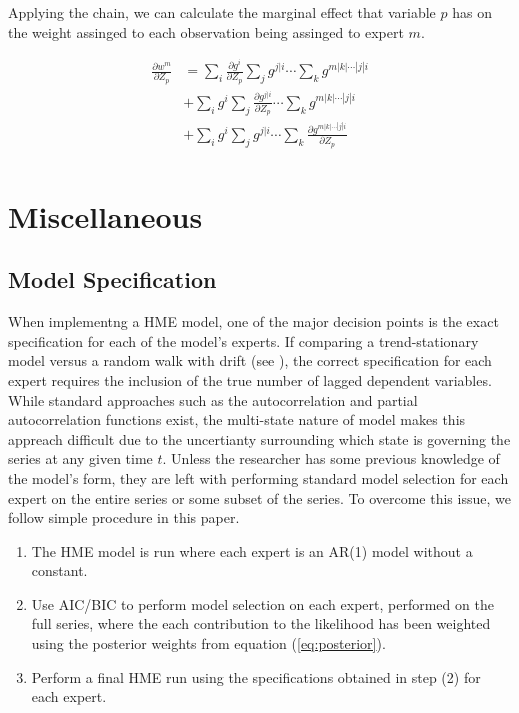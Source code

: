 \documentclass[12pt]{article}
\begin{document}
Applying the chain, we can calculate the marginal effect that variable $p$ has on the weight assinged to each observation being assinged to expert $m$.

\begin{equation}
  \begin{split}
    \frac{\partial w^{m}}{\partial Z_{p}} &= \sum_{i} \frac{\partial g^{i}}{\partial Z_{p}} \sum_{j} g^{j|i} \cdots \sum_{k} g^{m|k|\cdots|j|i} \\
    &+ \sum_{i} g^{i} \sum_{j} \frac{\partial g^{j|i}}{\partial Z_{p}} \cdots \sum_{k} g^{m|k|\cdots|j|i} \\
    &+ \sum_{i} g^{i} \sum_{j} g^{j|i} \cdots \sum_{k} \frac{\partial g^{m|k|\cdots|j|i}}{\partial Z_{p}} \\
  \end{split}
\end{equation}



\section{Miscellaneous}



\subsection{Model Specification}
When implementng a HME model, one of the major decision points is the exact specification for each of the model's experts. If comparing a trend-stationary model versus a random walk with drift (see \cite{HuertaJiangTanner2003}), the correct specification for each expert requires the inclusion of the true number of lagged dependent variables. While standard approaches such as the autocorrelation and partial autocorrelation functions exist, the multi-state nature of model makes this appreach difficult due to the uncertianty surrounding which state is governing the series at any given time $t$. Unless the researcher has some previous knowledge of the model's form, they are left with performing standard model selection for each expert on the entire series or some subset of the series. To overcome this issue, we follow simple procedure in this paper.

\begin{enumerate}
\item The HME model is run where each expert is an AR(1) model without a constant.
\item Use AIC/BIC to perform model selection on each expert, performed on the full series, where the each contribution to the likelihood has been weighted using the posterior weights from equation (\ref{eq:posterior}).
\item Perform a final HME run using the specifications obtained in step (2) for each expert.
\end{enumerate}
\end{document}
